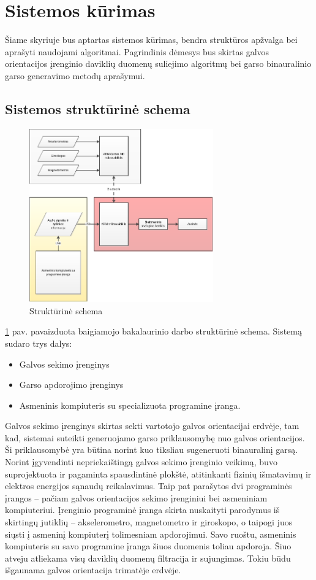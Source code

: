 \documentclass[]{vgtuef}
\begin{document}
\section{Sistemos kūrimas}

Šiame skyriuje bus aptartas sistemos kūrimas, bendra struktūros apžvalga bei aprašyti naudojami algoritmai. Pagrindinis dėmesys bus skirtas galvos orientacijos įrenginio daviklių duomenų suliejimo algoritmų bei garso binauralinio garso generavimo metodų aprašymui.

\subsection{Sistemos struktūrinė schema}

\begin{figure}[!h]
  \centering
  \includegraphics[width=300px]{img/schema.png}
  \caption{Struktūrinė schema}
  \label{fig:full_schematic}
\end{figure}

\ref{fig:full_schematic} pav. pavaizduota baigiamojo bakalaurinio darbo struktūrinė schema. Sistemą sudaro trys dalys:

\begin{itemize}
\item Galvos sekimo įrenginys
\item Garso apdorojimo įrenginys
\item Asmeninis kompiuteris su specializuota programine įranga.
\end{itemize}

Galvos sekimo įrenginys skirtas sekti vartotojo galvos orientacijai erdvėje, tam kad, sistemai suteikti generuojamo garso priklausomybę nuo galvos orientacijos. Ši priklausomybė yra būtina norint kuo tiksliau sugeneruoti binauralinį garsą. Norint įgyvendinti nepriekaištingą galvos sekimo įrenginio veikimą, buvo suprojektuota ir pagaminta spausdintinė plokštė, atitinkanti fizinių išmatavimų ir elektros energijos sąnaudų reikalavimus. Taip pat parašytos dvi programinės įrangos – pačiam galvos orientacijos sekimo įrenginiui bei asmeniniam kompiuteriui. Įrenginio programinė įranga skirta nuskaityti parodymus iš skirtingų jutiklių – akselerometro, magnetometro ir giroskopo, o taipogi juos siųsti į asmeninį kompiuterį tolimesniam apdorojimui. Savo ruoštu, asmeninis kompiuteris su savo programine įranga šiuos duomenis toliau apdoroja. Šiuo atveju atliekama visų daviklių duomenų filtracija ir sujungimas. Tokiu būdu išgaunama galvos orientacija trimatėje erdvėje.
\end{document}
